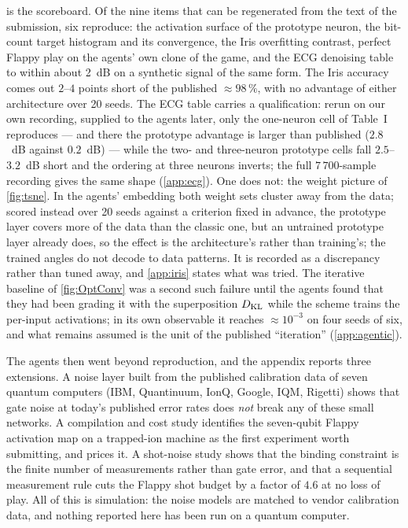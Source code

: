  is the scoreboard.  Of the nine items that can be
regenerated from the text of the submission, six reproduce: the activation surface of the
prototype neuron, the bit-count target histogram and its convergence, the Iris overfitting
contrast, perfect Flappy play on the agents' own clone of the game, and the ECG denoising
table to within about 2~dB on a synthetic signal of the same form.  The Iris accuracy comes
out $2$--$4$ points short of the published $\approx 98\,\%$, with no advantage of either
architecture over 20 seeds.  The ECG table carries a qualification: rerun on our own recording, supplied to the agents later,
only the one-neuron cell of Table~I reproduces --- and there the prototype advantage is larger
than published ($2.8$~dB against $0.2$~dB) --- while the two- and three-neuron prototype cells
fall $2.5$--$3.2$~dB short and the ordering at three neurons inverts; the full
$7\,700$-sample recording gives the same shape (\cref{app:ecg}).  One does not: the weight
picture of \cref{fig:tsne}.  In the agents' embedding both weight sets cluster away from the
data; scored instead over 20 seeds against a criterion fixed in advance, the prototype layer
covers more of the data than the classic one, but an untrained prototype layer already does, so
the effect is the architecture's rather than training's; the trained angles do not decode to
data patterns.  It is recorded as a discrepancy rather than tuned away,
and \cref{app:iris} states what was tried.  The iterative baseline of \cref{fig:OptConv} was a second
such failure until the agents found that they had been grading it with the superposition
$D_{\mathrm{KL}}$ while the scheme trains the per-input activations; in its own observable it reaches
$\approx10^{-3}$ on four seeds of six, and what remains assumed is the unit of the published
``iteration'' (\cref{app:agentic}).

The agents then went beyond reproduction, and the appendix reports three extensions.  A
noise layer built from the published calibration data of seven quantum computers (IBM,
Quantinuum, IonQ, Google, IQM, Rigetti) shows that gate noise at today's published error
rates does \emph{not} break any of these small networks.  A compilation and cost study
identifies the seven-qubit Flappy activation map on a trapped-ion machine as the first
experiment worth submitting, and prices it.  A shot-noise study shows that the binding
constraint is the finite number of measurements rather than gate error, and that a
sequential measurement rule cuts the Flappy shot budget by a factor of $4.6$ at no loss of
play.  All of this is simulation: the noise models are matched to vendor calibration data,
and nothing reported here has been run on a quantum computer.
